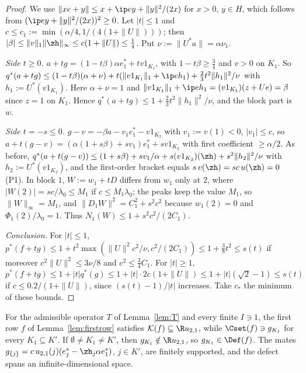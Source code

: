 \begin{proof}
We use $\|xe+y\|\le x+\ip ey+\|y\|^2/(2x)$ for $x>0$, $y\in H$, which follows
from $(\ip ey+\|y\|^2/(2x))^2\ge0$.  Let $|t|\le1$ and $c\le c_1:=
\min(\alpha/4,1/(4(1+\|U\|)))$; then $|\beta|\le\|v\|_1\|\zh\|_\infty\le
c(1+\|U\|)\le\frac14$.  Put $\nu:=\|U^*a\|=\alpha\nu_1$.

\emph{Side $t\ge0$.}  $a+tg=(1-t\beta)\alpha e_1^*+tv1_{K_1}$, with
$1-t\beta\ge\frac34$ and $v>0$ on $K_1$.  So
$q^*(a+tg)\le(1-t\beta)(\alpha+\nu)+t(\|v1_{K_1}\|_1+\ip e{h_1})+\frac23t^2
\|h_1\|^2/\nu$ with $h_1:=U^*(v1_{K_1})$.  Here $\alpha+\nu=1$ and
$\|v1_{K_1}\|_1+\ip e{h_1}=(v1_{K_1})(z+Ue)=\beta$ since $z=1$ on $K_1$.
Hence $q^*(a+tg)\le1+\frac23t^2\|h_1\|^2/\nu$, and the block part is $w$.

\emph{Side $t=-s\le0$.}  $g-v=-\beta a-v_1e_1^*-v1_{K_2}$ with
$v_1:=v(1)<0$, $|v_1|\le c$, so $a+t(g-v)=(\alpha(1+s\beta)+sv_1)e_1^*+
sv1_{K_2}$ with first coefficient $\ge\alpha/2$.  As before,
$q^*(a+t(g-v))\le(1+s\beta)+sv_1/\alpha+s(v1_{K_2})(\zh)+s^2\|h_2\|^2/\nu$
with $h_2:=U^*(v1_{K_2})$, and the first-order bracket equals
$s\,v(\zh)=sc\,u(\zh)=0$ (P1).  In block $1$, $W:=w_1+tD$ differs from
$w_1$ only at $2$, where $|W(2)|=sc/\lambda_0\le M_1$ if $c\le M_1\lambda_0$;
the peaks keep the value $M_1$, so $\|W\|_\infty=M_1$, and
$\|D_1W\|^2=C_1^2+s^2c^2$ because $w_1(2)=0$ and $\Phi_1(2)/\lambda_0=1$.
Thus $N_1(W)\le1+s^2c^2/(2C_1)$.

\emph{Conclusion.}  For $|t|\le1$, $p^*(f+tg)\le1+t^2\max(\|U\|^2c^2/\nu,
c^2/(2C_1))\le1+\frac38t^2\le s(t)$ if moreover $c^2\|U\|^2\le3\nu/8$ and
$c^2\le\frac34C_1$.  For $|t|\ge1$, $p^*(f+tg)\le1+|t|q^*(g)\le1+|t|\cdot
2c(1+\|U\|)\le1+|t|(\sqrt2-1)\le s(t)$ if $c\le0.2/(1+\|U\|)$, since
$(s(t)-1)/|t|$ increases.  Take $c_*$ the minimum of these bounds.
\end{proof}

\begin{theorem}\label{thm:defect}
For the admissible operator $T$ of Lemma~\ref{lem:T} and every finite
$I\ni1$, the first row $f$ of Lemma~\ref{lem:firstrow} satisfies
$\mathcal K(f)\subseteq\R u_{2,1}$, while $\Cset(f)\ni g_{K_1}$ for every
$K_1\subseteq K'$.  If $\emptyset\ne K_1\ne K'$, then $g_{K_1}\notin\R
u_{2,1}$, so $g_{K_1}\in\Def(f)$.  The mates $g_{\{j\}}=c\,u_{2,1}(j)
(e_j^*-\zh_j\alpha e_1^*)$, $j\in K'$, are finitely supported, and the
defect spans an infinite-dimensional space.
\end{theorem}

